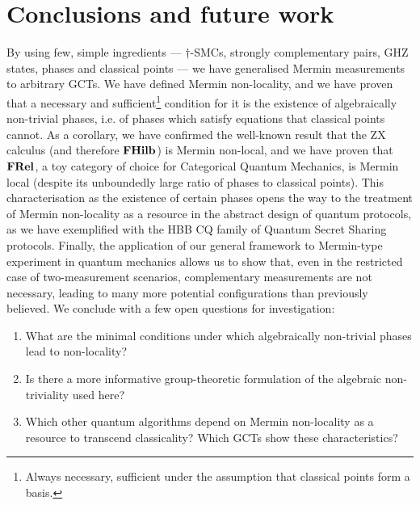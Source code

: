 
\section{Conclusions and future work}
        \label{section_conclusion}
        By using few, simple ingredients --- $\dagger$-SMCs, strongly complementary pairs, GHZ states, phases and classical points --- we have generalised Mermin measurements to arbitrary GCTs. 
        We have defined Mermin non-locality, and we have proven that a necessary and sufficient\footnote{Always necessary, sufficient under the assumption that classical points form a basis.} condition for it is the existence of algebraically non-trivial phases, i.e. of phases which satisfy equations that classical points cannot. 
        As a corollary, we have confirmed the well-known result that the ZX calculus (and therefore $\mathbf{FHilb}$) is Mermin non-local, and we have proven that $\mathbf{FRel}$, a toy category of choice for Categorical Quantum Mechanics, is Mermin local (despite its unboundedly large ratio of phases to classical points). 
        This characterisation as the existence of certain phases opens the way to the treatment of Mermin non-locality as a resource in the abstract design of quantum protocols, as we have exemplified with the HBB CQ family of Quantum Secret Sharing protocols. 
        Finally, the application of our general framework to Mermin-type experiment in quantum mechanics allows us to show that, even in the restricted case of two-measurement scenarios, complementary measurements are not necessary, leading to many more potential configurations than previously believed.
        We conclude with a few open questions for investigation:
        \begin{enumerate}
        \item[1.] What are the minimal conditions under which algebraically non-trivial phases lead to non-locality?
        \item[2.] Is there a more informative group-theoretic formulation of the algebraic non-triviality used here?
        \item[3.] Which other quantum algorithms depend on Mermin non-locality as a resource to transcend classicality? Which GCTs show these characteristics?
        \end{enumerate}

